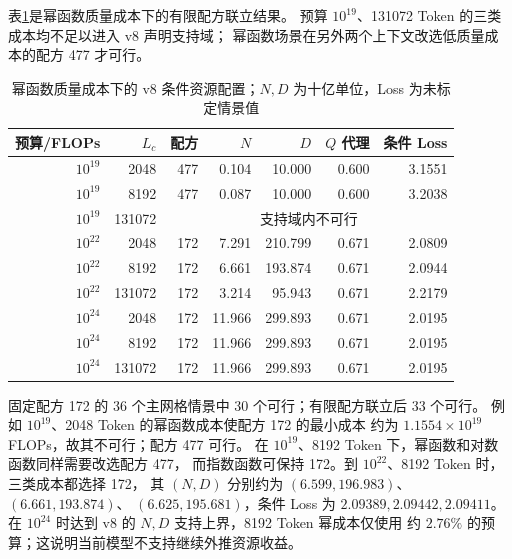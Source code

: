 表\ref{tab:q3_v8_power}是幂函数质量成本下的有限配方联立结果。
预算 $10^{19}$、131072 Token 的三类成本均不足以进入 v8 声明支持域；
幂函数场景在另外两个上下文改选低质量成本的配方 477 才可行。
\begin{table}[htbp]
\centering\small
\caption{幂函数质量成本下的 v8 条件资源配置；$N,D$ 为十亿单位，Loss 为未标定情景值}
\label{tab:q3_v8_power}
\begin{tabular}{rrrrrrr}
\toprule
预算/FLOPs & $L_c$ & 配方 & $N$ & $D$ & $Q$ 代理 & 条件 Loss\\
\midrule
$10^{19}$ & 2048 & 477 & 0.104 & 10.000 & 0.600 & 3.1551\\
$10^{19}$ & 8192 & 477 & 0.087 & 10.000 & 0.600 & 3.2038\\
$10^{19}$ & 131072 & \multicolumn{5}{c}{支持域内不可行}\\
$10^{22}$ & 2048 & 172 & 7.291 & 210.799 & 0.671 & 2.0809\\
$10^{22}$ & 8192 & 172 & 6.661 & 193.874 & 0.671 & 2.0944\\
$10^{22}$ & 131072 & 172 & 3.214 & 95.943 & 0.671 & 2.2179\\
$10^{24}$ & 2048 & 172 & 11.966 & 299.893 & 0.671 & 2.0195\\
$10^{24}$ & 8192 & 172 & 11.966 & 299.893 & 0.671 & 2.0195\\
$10^{24}$ & 131072 & 172 & 11.966 & 299.893 & 0.671 & 2.0195\\
\bottomrule
\end{tabular}
\end{table}

固定配方 172 的 36 个主网格情景中 30 个可行；有限配方联立后 33 个可行。
例如 $10^{19}$、2048 Token 的幂函数成本使配方 172 的最小成本
约为 $1.1554\times10^{19}$ FLOPs，故其不可行；配方 477 可行。
在 $10^{19}$、8192 Token 下，幂函数和对数函数同样需要改选配方 477，
而指数函数可保持 172。到 $10^{22}$、8192 Token 时，三类成本都选择 172，
其 $(N,D)$ 分别约为 $(6.599,196.983)$、$(6.661,193.874)$、
$(6.625,195.681)$，条件 Loss 为 $2.09389,2.09442,2.09411$。
在 $10^{24}$ 时达到 v8 的 $N,D$ 支持上界，8192 Token 幂成本仅使用
约 $2.76\%$ 的预算；这说明当前模型不支持继续外推资源收益。

